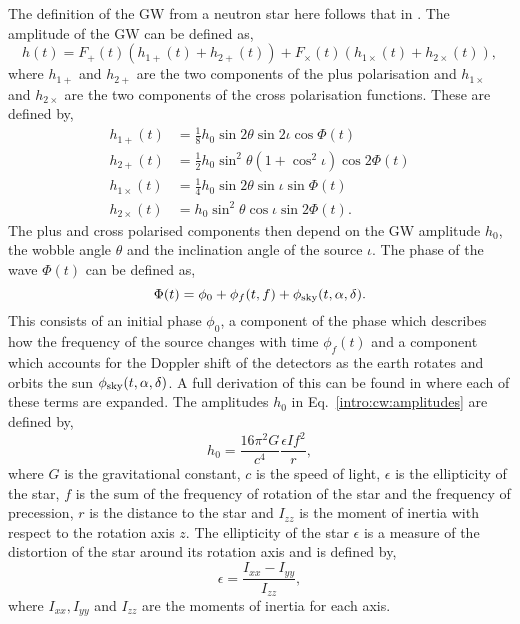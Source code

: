 The definition of the \ac{GW} from a neutron star here follows that in \citep{Schutz1998DataDetection}. The amplitude of the \ac{GW} can be defined as,
\begin{equation}
\label{intro:cw:ht}
h(t) = F_+(t)(h_{1+}(t) + h_{2+}(t)) +F_{\times}(t)(h_{1\times}(t) + h_{2\times}(t)),
\end{equation}
where $h_{1+}$ and $h_{2+}$ are the two components of the plus polarisation and $h_{1\times}$ and $h_{2\times}$ are the two components of the cross polarisation functions.
These are defined by,
\begin{equation}
\label{intro:cw:amplitudes}
    \begin{split}
        h_{1+}(t) &= \frac{1}{8} h_0 \sin{2\theta} \sin{2\iota}\cos{\Phi(t)} \\
        h_{2+}(t) &= \frac{1}{2} h_0 \sin^2{\theta} \left( 1 + \cos^2{\iota}\right) \cos{2\Phi(t)} \\
        h_{1\times}(t) &= \frac{1}{4} h_0 \sin{2\theta} \sin{\iota} \sin{\Phi(t)} \\
        h_{2\times}(t) &= h_0 \sin^2{\theta} \cos{\iota} \sin{2\Phi(t)}.
    \end{split}
\end{equation}
The plus and cross polarised components then depend on the \ac{GW} amplitude $h_0$, the wobble angle $\theta$ and the inclination angle of the source $\iota$. The phase of the wave $\Phi(t)$ can be defined as,
\begin{equation}
    \Phi(t) = \phi_0 + \phi_{f}(t,f) + \phi_{{\rm sky}}(t,\alpha,\delta).
\end{equation}
This consists of an initial phase $\phi_0$, a component of the phase which describes how the frequency of the source changes with time $\phi_f(t)$ and a component which accounts for the Doppler shift of the detectors as the earth rotates and orbits the sun $\phi_{{\rm sky}}(t,\alpha,\delta)$.
A full derivation of this can be found in \citep{Schutz1998DataDetection} where each of these terms are expanded.
The amplitudes $h_0$ in Eq.~\ref{intro:cw:amplitudes} are defined by,
\begin{equation}
    h_0 = \frac{16 \pi^2 G}{c^4} \frac{\epsilon I f^2}{r},
\end{equation}
where $G$ is the gravitational constant, $c$ is the speed of light, $\epsilon$ is the ellipticity of the star, $f$ is the sum of the frequency of rotation of the star and the frequency of precession, $r$ is the distance to the star and $I_{zz}$ is the moment of inertia with respect to the rotation axis $z$.
The ellipticity of the star $\epsilon$ is a measure of the distortion of the star around its rotation axis and is defined by,
\begin{equation}
    \epsilon = \frac{I_{xx} - I_{yy}}{I_{zz}},
\end{equation}
where $I_{xx}, I_{yy}$ and $I_{zz}$ are the moments of inertia for each axis.

